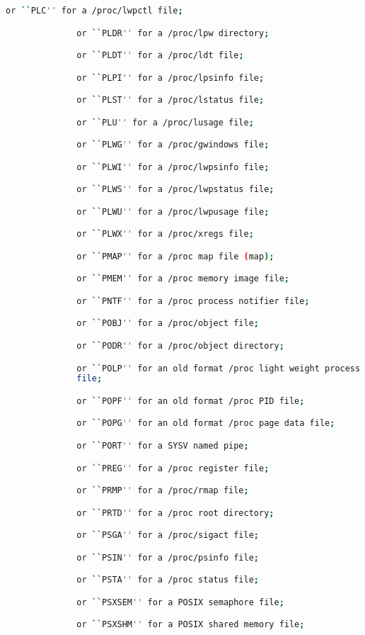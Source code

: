 {{\begin{lstlisting}[language=bash]
              or ``PLC'' for a /proc/lwpctl file;

              or ``PLDR'' for a /proc/lpw directory;

              or ``PLDT'' for a /proc/ldt file;

              or ``PLPI'' for a /proc/lpsinfo file;

              or ``PLST'' for a /proc/lstatus file;

              or ``PLU'' for a /proc/lusage file;

              or ``PLWG'' for a /proc/gwindows file;

              or ``PLWI'' for a /proc/lwpsinfo file;

              or ``PLWS'' for a /proc/lwpstatus file;

              or ``PLWU'' for a /proc/lwpusage file;

              or ``PLWX'' for a /proc/xregs file;

              or ``PMAP'' for a /proc map file (map);

              or ``PMEM'' for a /proc memory image file;

              or ``PNTF'' for a /proc process notifier file;

              or ``POBJ'' for a /proc/object file;

              or ``PODR'' for a /proc/object directory;

              or ``POLP'' for an old format /proc light weight process
              file;

              or ``POPF'' for an old format /proc PID file;

              or ``POPG'' for an old format /proc page data file;

              or ``PORT'' for a SYSV named pipe;

              or ``PREG'' for a /proc register file;

              or ``PRMP'' for a /proc/rmap file;

              or ``PRTD'' for a /proc root directory;

              or ``PSGA'' for a /proc/sigact file;

              or ``PSIN'' for a /proc/psinfo file;

              or ``PSTA'' for a /proc status file;

              or ``PSXSEM'' for a POSIX semaphore file;

              or ``PSXSHM'' for a POSIX shared memory file;


\end{lstlisting}}}
